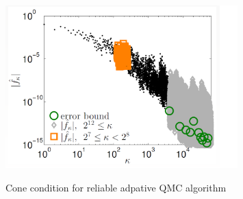 \begin{figure}[h]
    \centering
    \caption{Cone condition for reliable adpative QMC algorithm}
    \includegraphics[width=0.8\textwidth]{figures/cone.bmp}
    \label{fg:cone}
\end{figure}
